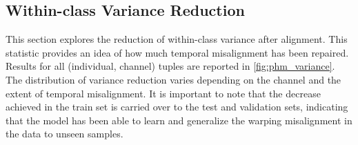 \subsection{Within-class Variance Reduction}

This section explores the reduction of within-class variance after alignment. This statistic provides an idea of how much temporal misalignment has been repaired. Results for all  (individual, channel) tuples are reported in \cref{fig:phm_variance}. 
The distribution of variance reduction varies depending on the channel and the extent of temporal misalignment. It is important to note that the decrease achieved in the train set is carried over to the test and validation sets, indicating that the model has been able to learn and generalize the warping misalignment in the data to unseen samples.

